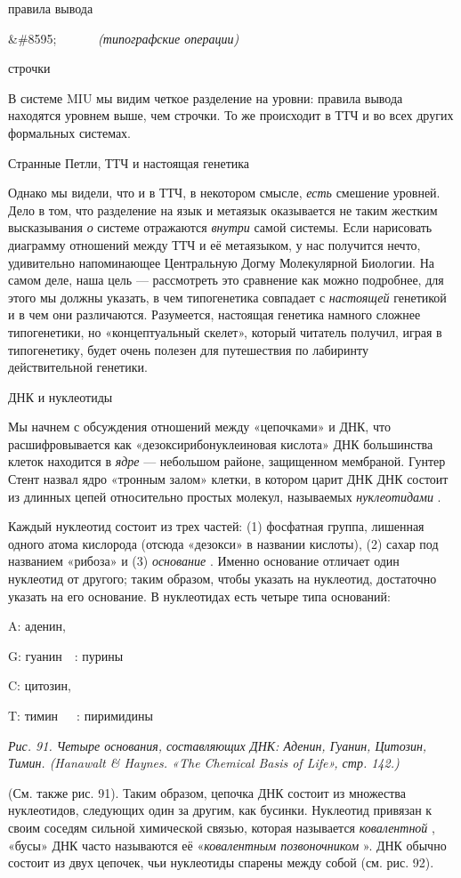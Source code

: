 \documentclass[../main.tex]{subfiles}
\begin{document}
правила вывода

\&\#8595;~~~~~~ \emph{(типографские операции)}

строчки

В системе MIU мы видим четкое разделение на уровни: правила вывода находятся уровнем выше, чем строчки. То же происходит в ТТЧ и во всех других формальных системах.

Странные Петли, ТТЧ и настоящая генетика

Однако мы видели, что и в ТТЧ, в некотором смысле, \emph{есть} смешение уровней. Дело в том, что разделение на язык и метаязык оказывается не таким жестким высказывания \emph{о} системе отражаются \emph{внутри} самой системы. Если нарисовать диаграмму отношений между ТТЧ и её метаязыком, у нас получится нечто, удивительно напоминающее Центральную Догму Молекулярной Биологии. На самом деле, наша цель --- рассмотреть это сравнение как можно подробнее, для этого мы должны указать, в чем типогенетика совпадает с \emph{настоящей} генетикой и в чем они различаются. Разумеется, настоящая генетика намного сложнее типогенетики, но «концептуальный скелет», который читатель получил, играя в типогенетику, будет очень полезен для путешествия по лабиринту действительной генетики.

ДНК и нуклеотиды

Мы начнем с обсуждения отношений между «цепочками» и ДНК, что расшифровывается как «дезоксирибонуклеиновая кислота» ДНК большинства клеток находится в \emph{ядре} --- небольшом районе, защищенном мембраной. Гунтер Стент назвал ядро «тронным залом» клетки, в котором царит ДНК ДНК состоит из длинных цепей относительно простых молекул, называемых \emph{нуклеотидами} .

Каждый нуклеотид состоит из трех частей: (1) фосфатная группа, лишенная одного атома кислорода (отсюда «дезокси» в названии кислоты), (2) сахар под названием «рибоза» и (3) \emph{основание} . Именно основание отличает один нуклеотид от другого; таким образом, чтобы указать на нуклеотид, достаточно указать на его основание. В нуклеотидах есть четыре типа оснований:

A: аденин,

G: гуанин~~: пурины

C: цитозин,

T: тимин~~~: пиримидины

\emph{Рис. 91. Четыре основания, составляющих ДНК: Аденин, Гуанин, Цитозин, Тимин. (Hanawalt \& Haynes. «The Chemical Basis of Life», стр. 142.)}

(См. также рис. 91). Таким образом, цепочка ДНК состоит из множества нуклеотидов, следующих один за другим, как бусинки. Нуклеотид привязан к своим соседям сильной химической связью, которая называется \emph{ковалентной} , «бусы» ДНК часто называются её «\emph{ковалентным позвоночником} ». ДНК обычно состоит из двух цепочек, чьи нуклеотиды спарены между собой (см. рис. 92).
\end{document}
